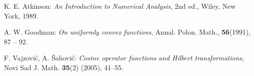 \documentclass[12pt]{amsart}
\numberwithin{equation}{section}
\numberwithin{definition}{section}
\numberwithin{theorem}{section}
\numberwithin{lemma}{section}
\numberwithin{remark}{section}
\numberwithin{corollary}{section}
\numberwithin{proposition}{section}
\numberwithin{equation}{section}
\begin{document}
\begin{thebibliography}{99}

{\small {\sc K. E. Atkinson}}: {\it An Introduction to Numerical Analysis}, 2nd ed., Wiley, New York, 1989.

{\small {\sc  A. W. Goodman}}:
{\it On uniformly convex functions},  Annal. Polon. Math., {\bf 56}(1991), 87 -- 92.

{\small {\sc  F. Vajzovi\'{c}, A. \v {S}ahovi\'{c}}}: {\it Cosine operator functions and Hilbert transformations},  Novi Sad J. Math. {\bf 35}(2) (2005), 41--55.

\end{thebibliography}


\label{lastpage}
\end{document}
